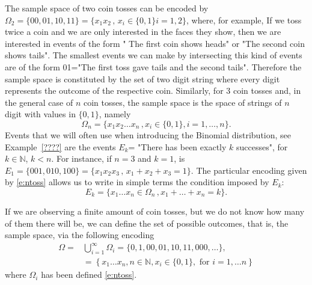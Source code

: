 \begin{example}
	\label{ex:n_coin}
The sample space of two coin tosses can be encoded by $\Omega_2=\{00,01,10,11\}= \{x_1x_2\,,\, x_i\in\{0,1\} i=1,2\}$, where, for example, 
If we toss twice a coin and we are only interested in the faces they show, then we are interested in events of the form " The first coin shows heads" or "The second coin shows tails". The smallest events we can make by intersecting this kind of events are of the form 01="The first toss gave tails and the second tails". Therefore the sample space is constituted by the set 
	of two digit string where every digit represents the outcome of the respective coin. 
	Similarly, for 3 coin tosses 
	 and, in the general case of $n$ coin tosses, the sample space is the space of strings of $n$ digit with values in $\{0,1\}$, namely 
	\begin{equation}
		\label{e:ntoss}
		\Omega_n = \{x_1x_2\ldots x_n\, , x_i \in \{0,1\} , i = 1,\ldots, n\}. 
	\end{equation}
	Events that we will often use when introducing the Binomial distribution, see Example~\ref{????} are the events $E_k$= "There has been exactly $k$ successes", for $k \in \mathbb N$, $k < n$. For instance, if $n = 3$ and $k = 1$, is $E_1=\{001,010,100\}=\{x_1x_2x_3\,,\,x_1+x_2+x_3=1\}$. The particular encoding given by \eqref{e:ntoss} allows us to write in simple terms the condition imposed by $E_k$:
	\begin{equation}
	\label{e:ntoss_ksuccesses}
		E_k = \{ x_1\ldots x_n \in \Omega_n \,, x_1 + \ldots + x_n = k \}.
	\end{equation}
\end{example}

\begin{example}
If we are observing a finite amount of coin tosses, but we do not know how many of them there will be, we can define the set of possible outcomes, that is, the sample space, via the following encoding  
\begin{equation}
    \label{e:finite_coin}
	\begin{split}
	\Omega= & \bigcup_{i=1}^\infty \Omega_i = \{0,1,00,01,10,11,000, \ldots \},\\
		& = \left\{ x_1\ldots x_n , n \in \mathbb N, x_i \in \{0,1\}, \text{ for $i = 1,\ldots n$}\right\}
	\end{split}
\end{equation}
	where $\Omega_i$ has been defined \ref{e:ntoss}. 

\end{example}

